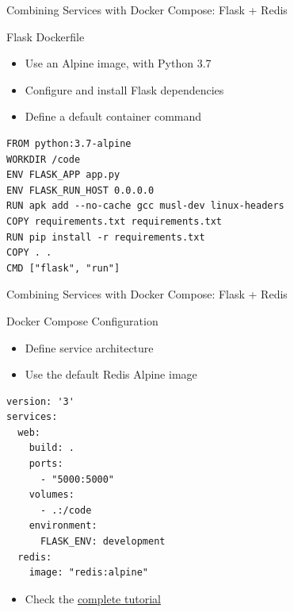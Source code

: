 \documentclass[10pt, compress, aspectratio=169, xcolor={table,usenames,dvipsnames}]{beamer}
\begin{document}
\begin{frame}[label={sec:orgc731492},fragile]{Combining Services with Docker Compose: Flask + Redis}
 \begin{block}{Flask Dockerfile}
\begin{itemize}
\item Use an Alpine image, with Python 3.7
\item Configure and install \alert{Flask} dependencies
\item Define a default \alert{container command}
\end{itemize}

\lstset{language=dockerfile,label= ,caption= ,captionpos=b,numbers=none}
\begin{lstlisting}
FROM python:3.7-alpine
WORKDIR /code
ENV FLASK_APP app.py
ENV FLASK_RUN_HOST 0.0.0.0
RUN apk add --no-cache gcc musl-dev linux-headers
COPY requirements.txt requirements.txt
RUN pip install -r requirements.txt
COPY . .
CMD ["flask", "run"]
\end{lstlisting}
\end{block}
\end{frame}

\begin{frame}[label={sec:orgef63f22},fragile]{Combining Services with Docker Compose: Flask + Redis}
 \begin{block}{Docker Compose Configuration}
\begin{itemize}
\item Define \alert{service architecture}
\item Use the \alert{default} Redis Alpine image
\end{itemize}

\lstset{language=yaml,label= ,caption= ,captionpos=b,numbers=none}
\begin{lstlisting}
version: '3'
services:
  web:
    build: .
    ports:
      - "5000:5000"
    volumes:
      - .:/code
    environment:
      FLASK_ENV: development
  redis:
    image: "redis:alpine"
\end{lstlisting}

\begin{itemize}
\item Check the \href{https://docs.docker.com/compose/gettingstarted/}{complete tutorial}
\end{itemize}
\end{block}
\end{frame}
\end{document}
